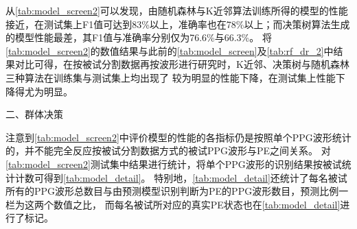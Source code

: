 从\autoref{tab:model_screen2}可以发现，由随机森林与K近邻算法训练所得的模型的性能接近，在测试集上F1值可达到83\%以上，准确率也在78\%以上；而决策树算法生成的模型性能最差，其F1值与准确率分别仅为76.6\%与66.3\%。
将\autoref{tab:model_screen2}的数值结果与此前的\autoref{tab:model_screen}及\autoref{tab:rf_dr_2}中结果对比可得，在按被试分割数据再按波形进行研究时，K近邻、决策树与随机森林三种算法在训练集与测试集上均出现了
较为明显的性能下降，在测试集上性能下降得尤为明显。

二、群体决策

注意到\autoref{tab:model_screen2}中评价模型的性能的各指标仍是按照单个PPG波形统计的，并不能完全反应按被试分割数据方式的被试PPG波形与PE之间关系。
对\autoref{tab:model_screen2}测试集中结果进行统计，将单个PPG波形的识别结果按被试统计计数可得到\autoref{tab:model_detail}。
特别地，\autoref{tab:model_detail}还统计了每名被试所有的PPG波形总数目与由预测模型识别判断为PE的PPG波形数目，预测比例一栏为这两个数值之比，
而每名被试所对应的真实PE状态也在\autoref{tab:model_detail}进行了标记。
